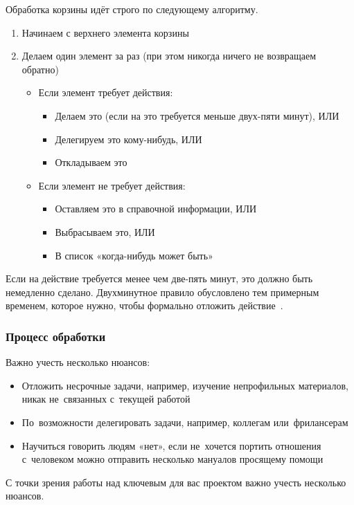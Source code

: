 \documentclass{../industrial-development}
\begin{document}
Обработка корзины идёт строго по следующему алгоритму.
\begin{enumerate}
\item Начинаем с верхнего элемента корзины
\item Делаем один элемент за раз (при этом никогда ничего не возвращаем обратно)
  \begin{itemize}
  \item Если элемент требует действия:
    \begin{itemize}
    \item Делаем это (если на это требуется меньше двух-пяти минут), ИЛИ
    \item Делегируем это кому-нибудь, ИЛИ
    \item Откладываем это
    \end{itemize}
  \item Если элемент не требует действия:
    \begin{itemize}
    \item Оставляем это в справочной информации, ИЛИ
    \item Выбрасываем это, ИЛИ
    \item В список «когда-нибудь может быть»
    \end{itemize}
  \end{itemize}
\end{enumerate}
Если на действие требуется менее чем две-пять минут, это должно быть немедленно сделано. Двухминутное правило обусловлено тем примерным временем, которое нужно, чтобы формально отложить действие~\cite{GTDWikipedia}.

\begin{frame} \frametitle{Процесс обработки}
Важно учесть несколько нюансов:
  \begin{itemize}
  \item Отложить несрочные задачи, например, изучение непрофильных материалов, никак не~связанных с~текущей работой
  \item По~возможности делегировать задачи, например, коллегам или~фрилансерам
  \item Научиться говорить людям «нет», если не~хочется портить отношения с~человеком можно отправить несколько мануалов просящему помощи
  \end{itemize}
\end{frame}

\lecturenotes

С точки зрения работы над ключевым для вас проектом важно учесть несколько нюансов.
\end{document}
